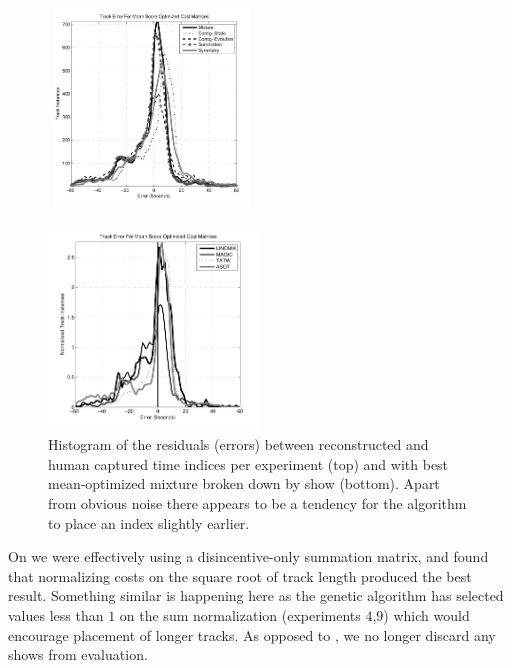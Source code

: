 \documentclass[twocolumn]{article}
\begin{document}
	\begin{figure}
		\centering
		
		\moveright 0.24cm \hbox{
		\includegraphics[width=0.46\textwidth]{images/shift_histogram}
		}
	
		\includegraphics[width=0.5\textwidth]{images/residuals_byshow}
		
		
		
		\caption{Histogram of the residuals (errors) between reconstructed and human captured time indices per experiment (top) and with best mean-optimized mixture broken down by show (bottom). Apart from obvious noise there appears to be a tendency for the algorithm to place an index slightly earlier.    }
		\label{fig:shifthistogram}
	\end{figure} 

On \citep{scarfe2013long} we were effectively using a disincentive-only summation matrix, and found that normalizing costs on the square root of track length produced the best result. Something similar is happening here as the genetic algorithm has selected values less than $1$ on the sum normalization (experiments $4$,$9$) which would encourage placement of longer tracks. As opposed to \citep{scarfe2013long}, we no longer discard any shows from evaluation.
\end{document}
